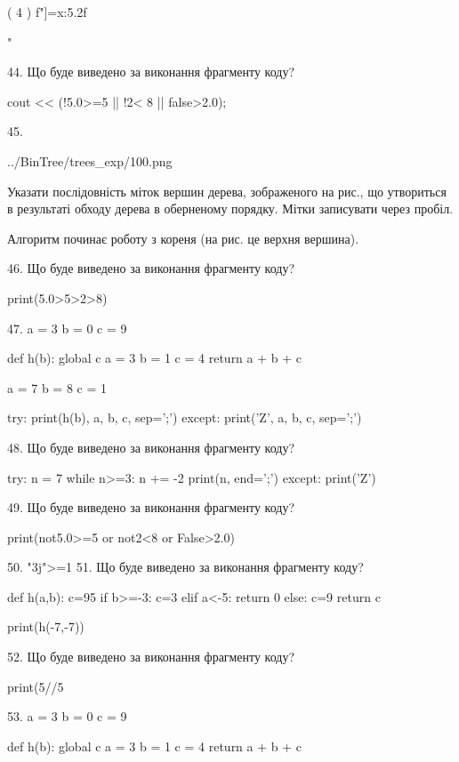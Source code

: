 \documentclass[11pt]{article}
\begin{document}
( 4 ) f"]={x:5.2f}{"

44. Що буде виведено за виконання фрагменту коду?

cout << (!5.0>=5 || !2< 8 || false>2.0);

45. 

\begin{center}
	{../BinTree/trees_exp/100.png}
\end{center}
Указати послідовність міток вершин дерева, зображеного на рис., що утвориться в результаті обходу дерева в оберненому порядку. Мітки записувати через пробіл.\par Алгоритм починає роботу з кореня (на рис. це верхня вершина).

46. Що буде виведено за виконання фрагменту коду?

print(5.0>5>2>8)

47. 
a = 3
b = 0
c = 9

def h(b):
global c    a = 3
    b = 1
    c = 4
    return a + b + c

a = 7
b = 8
c = 1

try:
    print(h(b), a, b, c, sep=';')
except:
    print('Z', a, b, c, sep=';')

48. Що буде виведено за виконання фрагменту коду?

try:
    n = 7
    while n>=3:
        n += -2
    print(n, end=';')
except:
    print('Z')


49. Що буде виведено за виконання фрагменту коду?

print(not5.0>=5 or not2<8 or False>2.0)

50. 
"3j">=1
51. Що буде виведено за виконання фрагменту коду?

def h(a,b):
    c=95
    if b>=-3:
        c=3
    elif a<-5:
         return 0
    else: 
        c=9
    return c

print(h(-7,-7))

52. Що буде виведено за виконання фрагменту коду?

print(5//5%

53. 
a = 3
b = 0
c = 9

def h(b):
global c    a = 3
    b = 1
    c = 4
    return a + b + c

}
\end{document}

